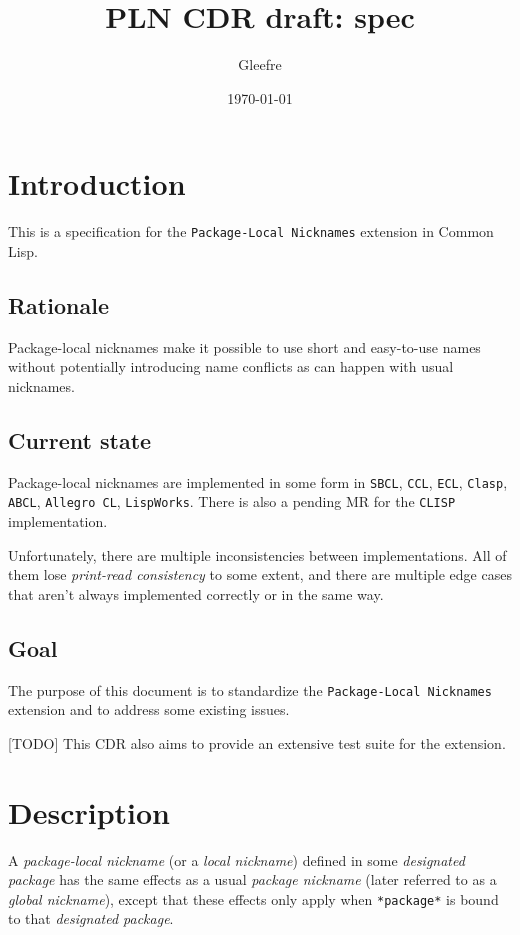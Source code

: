 \documentclass[11pt]{article}
\author{Gleefre}
\date{\today}
\title{PLN CDR draft: spec}
\begin{document}
\maketitle

\section{Introduction}
\label{sec:orgb1e1bd5}
This is a specification for the \texttt{Package-Local Nicknames} extension in Common Lisp.
\subsection{Rationale}
\label{sec:org7058bee}
Package-local nicknames make it possible to use short and easy-to-use names
without potentially introducing name conflicts as can happen with usual nicknames.
\subsection{Current state}
\label{sec:org53d26c0}
Package-local nicknames are implemented in some form in \texttt{SBCL}, \texttt{CCL}, \texttt{ECL},
\texttt{Clasp}, \texttt{ABCL}, \texttt{Allegro CL}, \texttt{LispWorks}. There is also a pending MR for the
\texttt{CLISP} implementation.

Unfortunately, there are multiple inconsistencies between implementations. All of
them lose \emph{print-read consistency} to some extent, and there are multiple edge
cases that aren't always implemented correctly or in the same way.
\subsection{Goal}
\label{sec:org87ec8e6}
The purpose of this document is to standardize the \texttt{Package-Local Nicknames}
extension and to address some existing issues.

[TODO] This CDR also aims to provide an extensive test suite for the extension.
\section{Description}
\label{sec:orgb3c90cf}
A \emph{package-local nickname} (or a \emph{local nickname}) defined in some \emph{designated
package} has the same effects as a usual \emph{package nickname} (later referred to as a
\emph{global nickname}), except that these effects only apply when \texttt{*package*} is bound
to that \emph{designated package}.
\end{document}
